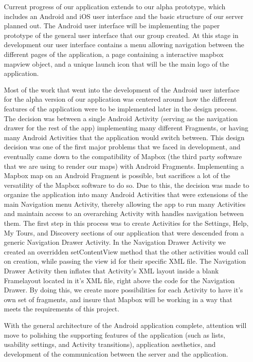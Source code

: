 \documentclass[letterpaper, 10pt,titlepage]{article}
\begin{document}
Current progress of our application extends to our alpha prototype, which includes an Android and iOS user interface and the basic structure of our server planned out. The Android user interface will be implementing the paper prototype of the general user interface that our group created. At this stage in development our user interface contains a menu allowing navigation between the different pages of the application, a page containing a interactive mapbox mapview object, and a unique launch icon that will be the main logo of the application. 

Most of the work that went into the development of the Android user interface for the alpha version of our application was centered around how the different features of the application were to be implemented later in the design process. The decision was between a single Android Activity (serving as the navigation drawer for the rest of the app) implementing many different Fragments, or having many Android Activities that the application would switch between. This design decision was one of the first major problems that we faced in development, and eventually came down to the compatibility of Mapbox (the third party software that we are using to render our maps) with Android Fragments. Implementing a Mapbox map on an Android Fragment is possible, but sacrifices a lot of the versatility of the Mapbox software to do so. Due to this, the decision was made to organize the application into many Android Activities that were extensions of the main Navigation menu Activity, thereby allowing the app to run many Activities and maintain access to an overarching Activity with handles navigation between them. The first step in this process was to create Activities for the Settings, Help, My Tours, and Discovery sections of our application that were descended from a generic Navigation Drawer Activity. In the Navigation Drawer Activity we created an overridden setContentView method that the other activities would call on creation, while passing the view id for their specific XML file. The Navigation Drawer Activity then inflates that Activity's XML layout inside a blank Framelayout located in it's XML file, right above the code for the Navigation Drawer. By doing this, we create more possibilities for each Activity to have it's own set of fragments, and insure that Mapbox will be working in a way that meets the requirements of this project. 

With the general architecture of the Android application complete, attention will move to polishing the supporting features of the application (such as lists, usability settings, and Activity transitions), application aesthetics, and development of the communication between the server and the application. 
\end{document}

